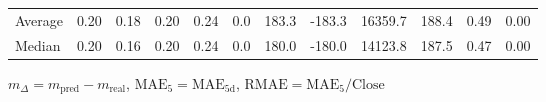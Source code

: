 \begin{threeparttable}
{\begin{tabular}{lrrrrrrrrrrr}
Average &          0.20 &          0.18 &          0.20 &        0.24 &                 0.0 &               183.3 &     -183.3 &             16359.7 &            188.4 &            0.49 &                   0.00 \\
 Median &          0.20 &          0.16 &          0.20 &        0.24 &                 0.0 &               180.0 &     -180.0 &             14123.8 &            187.5 &            0.47 &                   0.00 \\
\bottomrule
\end{tabular}
}
\begin{tablenotes}\footnotesize
\item $m_\Delta=m_{\text{pred}}-m_{\text{real}}$,
$\mathrm{MAE}_5=\mathrm{MAE}_{5\text{d}}$,
$\mathrm{RMAE}=\mathrm{MAE}_5/\text{Close}$
\end{tablenotes}
\end{threeparttable}
\endgroup


